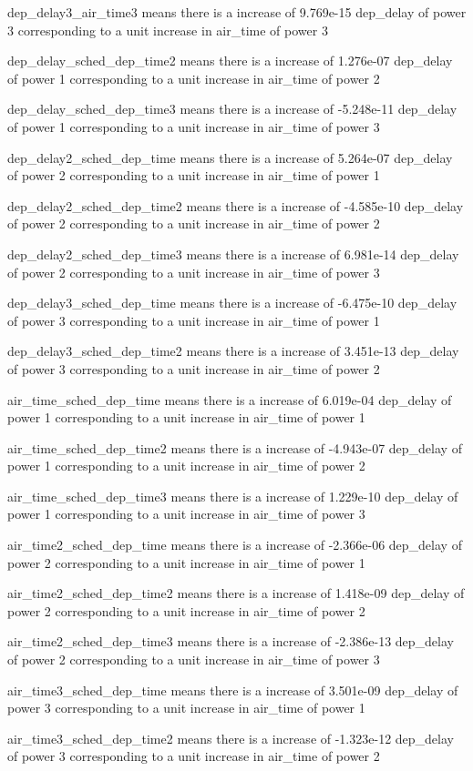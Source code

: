 \documentclass[
]{article}
\begin{document}
dep\_delay3\_air\_time3 means there is a increase of 9.769e-15
dep\_delay of power 3 corresponding to a unit increase in air\_time of
power 3

dep\_delay\_sched\_dep\_time2 means there is a increase of 1.276e-07
dep\_delay of power 1 corresponding to a unit increase in air\_time of
power 2

dep\_delay\_sched\_dep\_time3 means there is a increase of -5.248e-11
dep\_delay of power 1 corresponding to a unit increase in air\_time of
power 3

dep\_delay2\_sched\_dep\_time means there is a increase of 5.264e-07
dep\_delay of power 2 corresponding to a unit increase in air\_time of
power 1

dep\_delay2\_sched\_dep\_time2 means there is a increase of -4.585e-10
dep\_delay of power 2 corresponding to a unit increase in air\_time of
power 2

dep\_delay2\_sched\_dep\_time3 means there is a increase of 6.981e-14
dep\_delay of power 2 corresponding to a unit increase in air\_time of
power 3

dep\_delay3\_sched\_dep\_time means there is a increase of -6.475e-10
dep\_delay of power 3 corresponding to a unit increase in air\_time of
power 1

dep\_delay3\_sched\_dep\_time2 means there is a increase of 3.451e-13
dep\_delay of power 3 corresponding to a unit increase in air\_time of
power 2

air\_time\_sched\_dep\_time means there is a increase of 6.019e-04
dep\_delay of power 1 corresponding to a unit increase in air\_time of
power 1

air\_time\_sched\_dep\_time2 means there is a increase of -4.943e-07
dep\_delay of power 1 corresponding to a unit increase in air\_time of
power 2

air\_time\_sched\_dep\_time3 means there is a increase of 1.229e-10
dep\_delay of power 1 corresponding to a unit increase in air\_time of
power 3

air\_time2\_sched\_dep\_time means there is a increase of -2.366e-06
dep\_delay of power 2 corresponding to a unit increase in air\_time of
power 1

air\_time2\_sched\_dep\_time2 means there is a increase of 1.418e-09
dep\_delay of power 2 corresponding to a unit increase in air\_time of
power 2

air\_time2\_sched\_dep\_time3 means there is a increase of -2.386e-13
dep\_delay of power 2 corresponding to a unit increase in air\_time of
power 3

air\_time3\_sched\_dep\_time means there is a increase of 3.501e-09
dep\_delay of power 3 corresponding to a unit increase in air\_time of
power 1

air\_time3\_sched\_dep\_time2 means there is a increase of -1.323e-12
dep\_delay of power 3 corresponding to a unit increase in air\_time of
power 2
\end{document}
